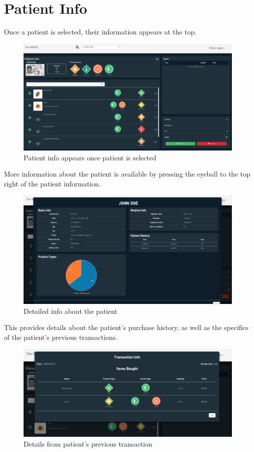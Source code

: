 \documentclass[]{book}
\theoremstyle{definition}
\theoremstyle{definition}
\theoremstyle{definition}
\theoremstyle{remark}
\begin{document}
\section{Patient Info}\label{patient-info}

Once a patient is selected, their information appears at the top.

\begin{figure}
\centering
\includegraphics{images/P2.png}
\caption{Patient info appears once patient is selected}
\end{figure}

More information about the patient is available by pressing the eyeball
to the top right of the patient information.

\begin{figure}
\centering
\includegraphics{images/P3.png}
\caption{Detailed info about the patient}
\end{figure}

This provides details about the patient's purchase history, as well as
the specifics of the patient's previous transactions.

\begin{figure}
\centering
\includegraphics{images/P4.png}
\caption{Details from patient's previous transaction}
\end{figure}
\end{document}
